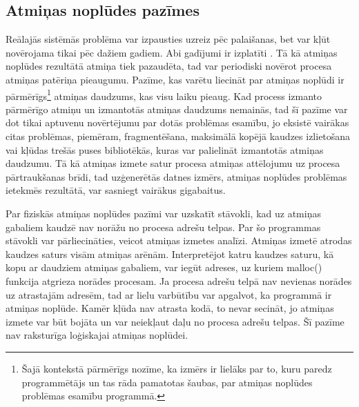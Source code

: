 \subsection{Atmiņas noplūdes pazīmes}

Reālajās sistēmās problēma var izpausties uzreiz pēc palaišanas, bet var kļūt novērojama tikai pēc dažiem gadiem. 
Abi gadījumi ir izplatīti \cite{HTTM}.
Tā kā atmiņas noplūdes rezultātā atmiņa tiek pazaudēta, tad var periodiski novērot procesa atmiņas patēriņa pieaugumu.
Pazīme, kas varētu liecināt par atmiņas noplūdi ir pārmērīgs\footnote{Šajā kontekstā pārmērīgs nozīme, ka izmērs ir lielāks par to, kuru paredz programmētājs un tas rāda pamatotas šaubas, par atmiņas noplūdes problēmas esamību programmā.}
atmiņas daudzums, kas visu laiku pieaug. 
Kad process izmanto pārmērīgo atmiņu un izmantotās atmiņas daudzums nemainās, tad šī pazīme var dot tikai aptuvenu novērtējumu par dotās problēmas esamību, jo eksistē vairākas citas problēmas, piemēram, fragmentēšana, maksimālā kopējā kaudzes izlietošana vai kļūdas trešās puses bibliotēkās, kuras var palielināt izmantotās atmiņas daudzumu.
Tā kā atmiņas izmete satur procesa atmiņas attēlojumu uz procesa pārtraukšanas brīdi, tad uzģenerētās datnes izmērs, atmiņas noplūdes problēmas ietekmēs rezultātā, var sasniegt vairākus gigabaitus.


Par fiziskās atmiņas noplūdes pazīmi var uzskatīt stāvokli, kad uz atmiņas gabaliem kaudzē nav norāžu no procesa adrešu telpas.
Par šo programmas stāvokli var pārliecināties, veicot atmiņas izmetes analīzi. 
Atmiņas izmetē atrodas kaudzes saturs visām atmiņas arēnām. 
Interpretējot katru kaudzes saturu, kā kopu ar daudziem atmiņas gabaliem, var iegūt adreses, uz kuriem malloc() funkcija atgrieza norādes procesam.
Ja procesa adrešu telpā nav nevienas norādes uz atrastajām adresēm, tad ar lielu varbūtību var apgalvot, ka programmā ir atmiņas noplūde.
Kamēr kļūda nav atrasta kodā, to nevar secināt, jo atmiņas izmete var būt bojāta un var neiekļaut daļu no procesa adrešu telpas.
Šī pazīme nav raksturīga loģiskajai atmiņas noplūdei.



